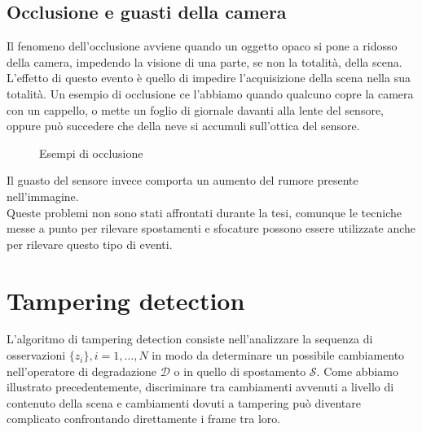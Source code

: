 \subsection{Occlusione e guasti della camera}
Il fenomeno dell'occlusione avviene quando un oggetto opaco si pone a ridosso della camera, impedendo la visione di una parte, se non la totalit\`a, della scena. 
L'effetto di questo evento \`e quello di impedire l'acquisizione della scena nella sua totalit\`a.
Un esempio di occlusione ce l'abbiamo quando qualcuno copre la camera con un cappello, o mette un foglio di giornale davanti alla lente del sensore, oppure pu\`o succedere che della neve si accumuli sull'ottica del sensore.
\begin{figure}
	\centering
	\caption{Esempi di occlusione}
	\label{fig:occlusion}
\end{figure}
\noindent Il guasto del sensore invece comporta un aumento del rumore presente nell'immagine. \\
Queste problemi non sono stati affrontati durante la tesi, comunque le tecniche messe a punto per rilevare spostamenti e sfocature possono essere utilizzate anche per rilevare questo tipo di eventi. 
\section{Tampering detection}
L'algoritmo di tampering detection consiste nell'analizzare la sequenza di osservazioni $\{z_i\}, i=1, \dots , N$ in modo da determinare un possibile cambiamento nell'operatore di degradazione $\mathcal{D}$ o in quello di spostamento $\mathcal{S}$.
Come abbiamo illustrato precedentemente, discriminare tra cambiamenti avvenuti a livello di contenuto della scena e cambiamenti dovuti a tampering pu\`o diventare complicato confrontando direttamente i frame tra loro.